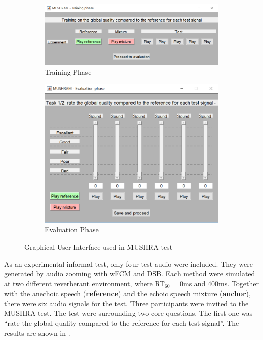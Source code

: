 \documentclass[a4paper,twoside,12pt,hidelinks]{article}
\begin{document}
\begin{figure}[H]
\centering	
\begin{subfigure}[H]{0.49\textwidth}
\includegraphics[width=\textwidth,frame]{mushra_training}
\caption{Training Phase}
\end{subfigure}
\begin{subfigure}[H]{0.49\textwidth}
\includegraphics[width=\textwidth,frame]{mushra_evaluation}
\caption{Evaluation Phase}
\end{subfigure}
\caption{Graphical User Interface used in MUSHRA test}
\label{fig:mushra}
\end{figure}

As an experimental informal test, only four test audio were included. They were generated by audio zooming with wFCM and DSB. Each method were simulated at two different reverberant environment, where RT$_{60}=$0ms and 400ms. Together with the anechoic speech (\textbf{reference}) and the echoic speech mixture (\textbf{anchor}), there were six audio signals for the test. Three participants were invited to the MUSHRA test. The test were surrounding two core questions. The first one was ``rate the global quality compared to the reference for each test signal''. The results are shown in . 
\end{document}
